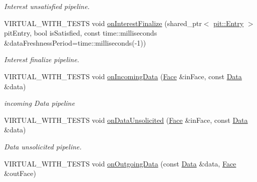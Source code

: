 \begin{DoxyCompactItemize}
\begin{DoxyCompactList}\small\item\em Interest unsatisfied pipeline. \end{DoxyCompactList}\item 
V\+I\+R\+T\+U\+A\+L\+\_\+\+W\+I\+T\+H\+\_\+\+T\+E\+S\+TS void \hyperlink{classnfd_1_1Forwarder_a5024e91d399140077e25040ab4f36324}{on\+Interest\+Finalize} (shared\+\_\+ptr$<$ \hyperlink{classnfd_1_1pit_1_1Entry}{pit\+::\+Entry} $>$ pit\+Entry, bool is\+Satisfied, const time\+::milliseconds \&data\+Freshness\+Period=time\+::milliseconds(-\/1))
\begin{DoxyCompactList}\small\item\em Interest finalize pipeline. \end{DoxyCompactList}\item 
V\+I\+R\+T\+U\+A\+L\+\_\+\+W\+I\+T\+H\+\_\+\+T\+E\+S\+TS void \hyperlink{classnfd_1_1Forwarder_a96efae9212a6950adb82d69f8a8a46ec}{on\+Incoming\+Data} (\hyperlink{classnfd_1_1Face}{Face} \&in\+Face, const \hyperlink{classndn_1_1Data}{Data} \&data)\hypertarget{classnfd_1_1Forwarder_a96efae9212a6950adb82d69f8a8a46ec}{}\label{classnfd_1_1Forwarder_a96efae9212a6950adb82d69f8a8a46ec}

\begin{DoxyCompactList}\small\item\em incoming Data pipeline \end{DoxyCompactList}\item 
V\+I\+R\+T\+U\+A\+L\+\_\+\+W\+I\+T\+H\+\_\+\+T\+E\+S\+TS void \hyperlink{classnfd_1_1Forwarder_ad52460747a8033fe1116716094bad854}{on\+Data\+Unsolicited} (\hyperlink{classnfd_1_1Face}{Face} \&in\+Face, const \hyperlink{classndn_1_1Data}{Data} \&data)\hypertarget{classnfd_1_1Forwarder_ad52460747a8033fe1116716094bad854}{}\label{classnfd_1_1Forwarder_ad52460747a8033fe1116716094bad854}

\begin{DoxyCompactList}\small\item\em Data unsolicited pipeline. \end{DoxyCompactList}\item 
V\+I\+R\+T\+U\+A\+L\+\_\+\+W\+I\+T\+H\+\_\+\+T\+E\+S\+TS void \hyperlink{classnfd_1_1Forwarder_a9db50b08eb3b1a7e3625c23af1b1d771}{on\+Outgoing\+Data} (const \hyperlink{classndn_1_1Data}{Data} \&data, \hyperlink{classnfd_1_1Face}{Face} \&out\+Face)\hypertarget{classnfd_1_1Forwarder_a9db50b08eb3b1a7e3625c23af1b1d771}{}\label{classnfd_1_1Forwarder_a9db50b08eb3b1a7e3625c23af1b1d771}


\end{DoxyCompactItemize}
